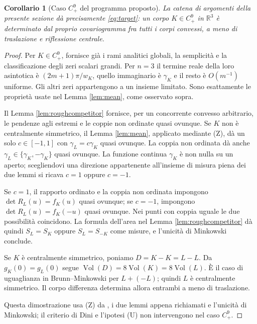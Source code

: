 \documentclass[11pt,a4paper]{article}
\newtheorem{corollary}[theorem]{Corollario}
\theoremstyle{remark}
\newcommand{\R}{\mathbb R}
\newcommand{\vol}{\operatorname{Vol}}
\begin{document}
\begin{corollary}[Caso $C^9_+$ del programma proposto]\label{cor:targetC9}
La catena di argomenti della presente sezione dà precisamente
\eqref{eq:target}: un corpo $K\in C^9_+$ in $\R^3$ è determinato
dal proprio covariogramma fra tutti i corpi convessi, a meno di
traslazione e riflessione centrale.
\end{corollary}
\begin{proof}
Per $K\in C^9_+$, \cite[Teoremi 4.1--4.2 e dimostrazione del
Teorema 4.2, pp.~14--15 del manoscritto]{B16} fornisce già i rami
analitici globali, la semplicità e la classificazione degli zeri
scalari grandi. Per $n=3$ il termine reale della loro asintotica è
$(2m+1)\pi/w_K$, quello immaginario è $\gamma_K$ e il resto è
$O(m^{-1})$ uniforme. Gli altri zeri appartengono a un insieme
limitato. Sono esattamente le proprietà usate nel Lemma
\ref{lem:mean}, come osservato sopra.

Il Lemma \ref{lem:roughcompetitor} fornisce, per un concorrente
convesso arbitrario, le pendenze agli estremi e le coppie non ordinate
quasi ovunque. Se $K$ non è centralmente simmetrico, il Lemma
\ref{lem:mean}, applicato mediante (Z), dà un solo $c\in[-1,1]$ con
$\gamma_L=c\gamma_K$ quasi ovunque. La coppia non ordinata dà anche
$\gamma_L\in\{\gamma_K,-\gamma_K\}$ quasi ovunque. La funzione
continua $\gamma_K$ è non nulla su un aperto; scegliendovi una
direzione appartenente all'insieme di misura piena dei due lemmi
si ricava $c=1$ oppure $c=-1$.

Se $c=1$, il rapporto ordinato e la coppia non ordinata impongono
$\det R_L(u)=f_K(u)$ quasi ovunque; se $c=-1$, impongono
$\det R_L(u)=f_K(-u)$ quasi ovunque. Nei punti con coppia uguale
le due possibilità coincidono. La formula dell'area nel Lemma
\ref{lem:roughcompetitor} dà quindi $S_L=S_K$ oppure $S_L=S_{-K}$
come misure, e l'unicità di Minkowski conclude.

Se $K$ è centralmente simmetrico, poniamo $D=K-K=L-L$.
Da $g_K(0)=g_L(0)$ segue
$\vol(D)=8\vol(K)=8\vol(L)$. È il caso di uguaglianza in
Brunn--Minkowski per $L+(-L)$; quindi $L$ è centralmente simmetrico.
Il corpo differenza determina allora entrambi a meno di traslazione.

Questa dimostrazione usa (Z) da \cite{B16}, i due lemmi appena
richiamati e l'unicità di Minkowski; il criterio di Dini e l'ipotesi
(U) non intervengono nel caso $C^9_+$.
\end{proof}
\end{document}
